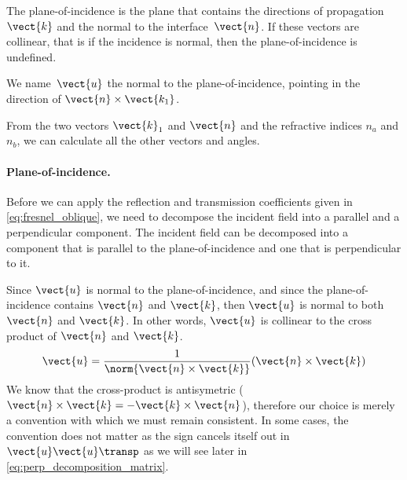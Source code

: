 The plane-of-incidence is the plane that contains the directions of propagation $\vect{k}$ and the normal to the interface~$\vect{n}$.
If these vectors are collinear, that is if the incidence is normal, then the plane-of-incidence is undefined.

We name~$\vect{u}$ the normal to the plane-of-incidence, pointing in the direction of $\vect{n} \times \vect{k_1}$.

From the two vectors $\vect{k}_1$ and $\vect{n}$ and the refractive indices $n_a$ and $n_b$, we can calculate all the other vectors and angles.

\paragraph{Plane-of-incidence.}
Before we can apply the reflection and transmission coefficients given in \cref{eq:fresnel_oblique}, we need to decompose the incident field into a parallel and a perpendicular component.
The incident field can be decomposed into a component that is parallel to the plane-of-incidence and one that is perpendicular to it.

Since $\vect{u}$ is normal to the plane-of-incidence, and since the plane-of-incidence contains $\vect{n}$ and $\vect{k}$, then $\vect{u}$ is normal to both $\vect{n}$ and $\vect{k}$.
In other words, $\vect{u}$ is collinear to the cross product of $\vect{n}$ and $\vect{k}$.
\begin{equation}
    \vect{u} = \frac{1}{\norm{\vect{n} \times \vect{k}}} (\vect{n} \times \vect{k})  \label{eq:normal_to_plane_of_incidence}
\end{equation}
We know that the cross-product is antisymetric
($\vect{n} \times \vect{k} = \mathord{-} \vect{k} \times \vect{n}$),
therefore our choice is merely a convention with which we must remain consistent.
In some cases, the convention does not matter as the sign cancels itself out in $\vect{u} \vect{u}\transp$ as we will see later in \cref{eq:perp_decomposition_matrix}.

